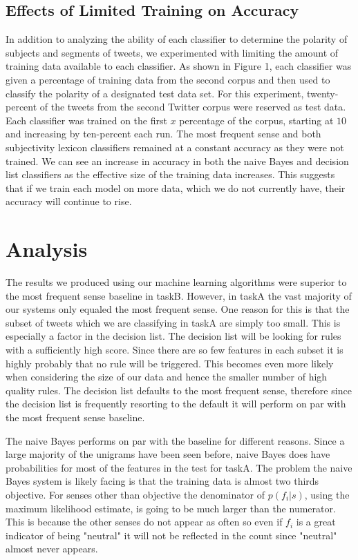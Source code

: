 \documentclass[11pt]{article}
\begin{document}
\subsection{Effects of Limited Training on Accuracy}
In addition to analyzing the ability of each classifier to determine the polarity of subjects and segments of tweets, we experimented with limiting the amount of training data available to each classifier. As shown in Figure 1, each classifier was given a percentage of training data from the second corpus and then used to classify the polarity of a designated test data set. For this experiment, twenty-percent of the tweets from the second Twitter corpus were reserved as test data. Each classifier was trained on the first $x$ percentage of the corpus, starting at $10$ and increasing by ten-percent each run. The most frequent sense and both subjectivity lexicon classifiers remained at a constant accuracy as they were not trained. We can see an increase in accuracy in both the naive Bayes and decision list classifiers as the effective size of the training data increases. This suggests that if we train each model on more data, which we do not currently have, their accuracy will continue to rise. 

\section{Analysis}
\indent The results we produced using our machine learning algorithms were superior to the most frequent sense baseline in taskB. However, in taskA the vast majority of our systems only equaled the most frequent sense. One reason for this is that the subset of tweets which we are classifying in taskA are simply too small. This is especially a factor in the decision list. The decision list will be looking for rules with a sufficiently high score. Since there are so few features in each subset it is highly probably that no rule will be triggered. This becomes even more likely when considering the size of our data and hence the smaller number of high quality rules. The decision list defaults to the most frequent sense, therefore since the decision list is frequently resorting to the default it will perform on par with the most frequent sense baseline.

The naive Bayes performs on par with the baseline for different reasons. Since a large majority of the unigrams have been seen before, naive Bayes does have probabilities for most of the features in the test for taskA. The problem the naive Bayes system is likely facing is that the training data is almost two thirds objective. For senses other than objective the denominator of $p(f_i |  s)$, using the maximum likelihood estimate, is going to be much larger than the numerator. This is because the other senses do not appear as often so even if $f_i$ is a great indicator of being "neutral" it will not be reflected in the count since "neutral" almost never appears.
\end{document}
